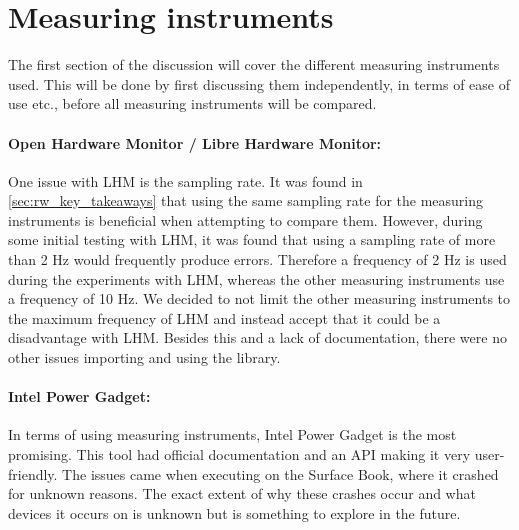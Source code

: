 \section{Measuring instruments}

The first section of the discussion will cover the different measuring instruments used. This will be done by first discussing them independently, in terms of ease of use etc., before all measuring instruments will be compared.

\paragraph*{Open Hardware Monitor / Libre Hardware Monitor:} One issue with LHM is the sampling rate. It was found in \cref{sec:rw_key_takeaways} that using the same sampling rate for the measuring instruments is beneficial when attempting to compare them. However, during some initial testing with LHM, it was found that using a sampling rate of more than 2 Hz would frequently produce errors. Therefore a frequency of 2 Hz is used during the experiments with LHM, whereas the other measuring instruments use a frequency of 10 Hz. We decided to not limit the other measuring instruments to the maximum frequency of LHM and instead accept that it could be a disadvantage with LHM. Besides this and a lack of documentation, there were no other issues importing and using the library.

\paragraph*{Intel Power Gadget:} In terms of using measuring instruments, Intel Power Gadget is the most promising. This tool had official documentation and an API making it very user-friendly. The issues came when executing on the Surface Book, where it crashed for unknown reasons. The exact extent of why these crashes occur and what devices it occurs on is unknown but is something to explore in the future.

